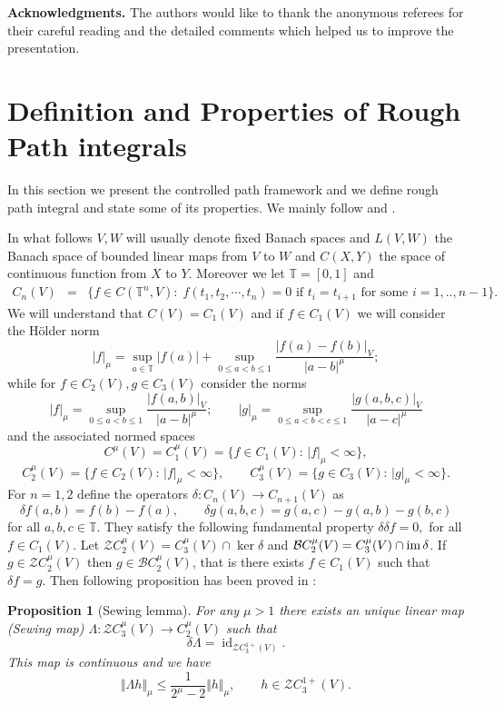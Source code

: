 \documentclass[11pt,a4paper,reqno]{amsart}%
\theoremstyle{plain}
\theoremstyle{remark}
\theoremstyle{plain}
\newtheorem{proposition}[theorem]{Proposition}
\numberwithin{equation}{section}
\newcommand\id{\operatorname{id}}
\def\im{\mbox{im\,}}
\def\supl{\sup\limits}
\def\supl{\mathop{\sup}\limits}
\begin{document}
\bigskip
\textbf{Acknowledgments.} The authors would like to thank the anonymous referees for their careful reading and the detailed comments which helped us to improve the presentation.
\vfill\newpage

\section{Definition and Properties of Rough Path integrals}
In this section we present the controlled path framework and we define rough path integral and state some of its properties. We mainly follow \cite{[Gubinelli-2004]} and
\cite{[Bess+Gub_2005]}.   

 In what follows $V,W$ will usually denote fixed Banach spaces and $L(V,W)$ the Banach space of bounded linear maps from $V$ to $W$ and $C(X,Y)$ the space of continuous function from $X$ to $Y$. Moreover we let $\mathbb{T}=[0,1]$ and
\begin{eqnarray*}
C_n(V)&=&\{f\in C(\mathbb{T}^n,V):\; f(t_1,t_2,\cdots,t_n)=0 \text{ if  $t_i=t_{i+1}$ for some $i=1,..,n-1$}\}.
\end{eqnarray*}
We will understand that $C(V) = C_1(V)$ and if $f\in C_1(V)$ we will consider the H\"older norm
$$
\vert f\vert_{\mu}=\supl_{a\in\mathbb{T}}|f(a)|+ \supl_{0\le a<b\le 1}\frac{\vert f(a)-f(b)\vert_{V}}{\vert a-b\vert^{\mu}};
$$
while for $f\in C_2(V), g\in C_3(V)$ consider the norms
$$
\vert f\vert_{\mu}=\supl_{0\le a<b\le 1}\frac{\vert f(a,b)\vert_{V}}{\vert a-b\vert^{\mu}};
\qquad
\vert g\vert_{\mu}=\supl_{0\le a<b<c\le 1}\frac{\vert g(a,b,c)\vert_{V}}{\vert a-c\vert^{\mu}}
$$
and the associated normed spaces
$$
C^\mu(V)= C_1^\mu(V) = \{f\in C_1(V):\, \vert f\vert_{\mu}<\infty\},
$$
$$
C_2^\mu(V) = \{f\in C_2(V):\, \vert f\vert_{\mu}<\infty\},
\qquad
C_3^\mu(V) = \{g\in C_3(V):\, \vert g\vert_{\mu}<\infty\}.
$$
For $n=1,2$ define the operators $\delta:C_n(V)\to C_{n+1}(V)$ as
$$
\delta f(a,b) = f(b)-f(a),\qquad
\delta g(a,b,c) = g(a,c)-g(a,b)-g(b,c)
$$  
for all $a,b,c\in\mathbb{T}$. They satisfy the following fundamental property
$
\delta\delta f=0,
$ for all $f\in C_1(V)$. Let
$\mathcal{Z}C_2^\mu(V) = C_3^\mu(V)\cap\ker\delta $ and $\mathcal{B}C_2^\mu(V) = C_3^\mu(V)\cap\im\delta $. If $g\in \mathcal{Z} C_2^\mu(V)$ then  $g\in\mathcal{B}C_2^\mu(V)$, that is there exists $f\in C_1(V)$ such that $\delta f = g$.
Then following  proposition has been proved in
\cite{[Gubinelli-2004]}:
\begin{proposition}[Sewing lemma] 
For any $\mu>1$ there exists an unique  linear map (Sewing map) 
$\Lambda:\mathcal{Z}C_3^{\mu}(V)\to C_2^{\mu}(V)$ such that
$$
\delta\Lambda=\id_{\mathcal{Z}C_3^{1+}(V)}.
$$
This map is continuous and we have
$$
\Vert \Lambda h\Vert_{\mu}\leq
\frac{1}{2^{\mu}-2}\Vert h\Vert_{\mu},\qquad h\in\mathcal{Z}C_3^{1+}(V).
$$
\end{proposition}
\end{document}
